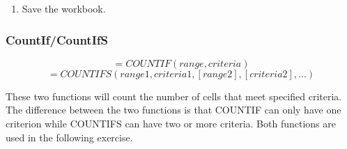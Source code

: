 \begin{enumerate}
	\item Save the  workbook.
	
\end{enumerate}

\subsubsection{CountIf/CountIfS}

\[ =COUNTIF(range, criteria) \]
\[ =COUNTIFS(range1, criteria1, [range2], [criteria2], ...) \]

These two functions will count the number of cells that meet specified criteria. The difference between the two functions is that COUNTIF can only have one criterion while COUNTIFS can have two or more criteria. Both functions are used in the following exercise.

